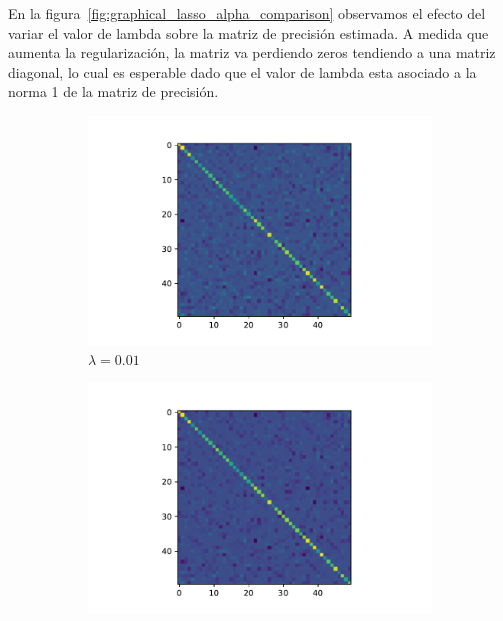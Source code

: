 \documentclass{article}
\begin{document}
En la figura~\ref{fig:graphical_lasso_alpha_comparison} observamos el efecto del variar el valor de lambda sobre la matriz de precisión estimada. A medida que aumenta la regularización, la matriz va perdiendo zeros tendiendo a una matriz diagonal, lo cual es esperable
dado que el valor de lambda esta asociado a la norma 1 de la matriz de precisión. 
\begin{figure}[htb]
    \centering
    \begin{subfigure}[t]{0.32\linewidth}
        \centering
        \includegraphics[width=\textwidth]{imagenes/graphical_lasso/graphical_lasso_alpha_0_01.pdf}
        \caption{$\lambda = 0.01$}
    \end{subfigure}\hfill
    \begin{subfigure}[t]{0.32\linewidth}
        \centering
        \includegraphics[width=\textwidth]{imagenes/graphical_lasso/graphical_lasso_alpha_0_02.pdf}

\end{subfigure}
\end{figure}
\end{document}
